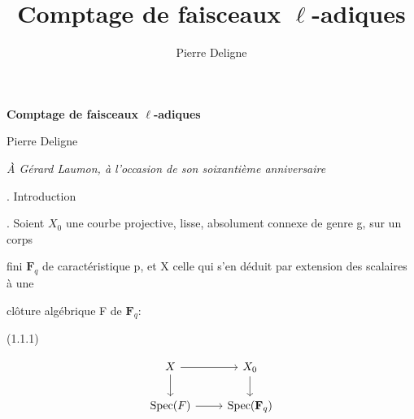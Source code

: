 \documentclass[11pt]{article}
\title{Comptage de faisceaux $\ell$-adiques}
\author{Pierre Deligne}
\date{}
\begin{document}
\begin{center}
{\Large\bfseries Comptage de faisceaux $\ell$-adiques}\par\medskip
{Pierre Deligne}\par\medskip
{\itshape À Gérard Laumon, à l'occasion de son soixantième anniversaire}\par
\end{center}
\bigskip
\small
\raggedright
{}. Introduction\par
{}. Soient \(X_0\) une courbe projective, lisse, absolument connexe de genre g, sur un corps\par
\noindent fini \(\mathbf F_q\) de caractéristique p, et X celle qui s’en déduit par extension des scalaires à une\par
\noindent clôture algébrique F de \(\mathbf F_q\):\par
\noindent (1.1.1)\par
\[
\begin{tikzcd}
X \arrow[r] \arrow[d] & X_0 \arrow[d] \\
\operatorname{Spec}(F) \arrow[r] & \operatorname{Spec}(\mathbf F_q)
\end{tikzcd}
\]
\end{document}
